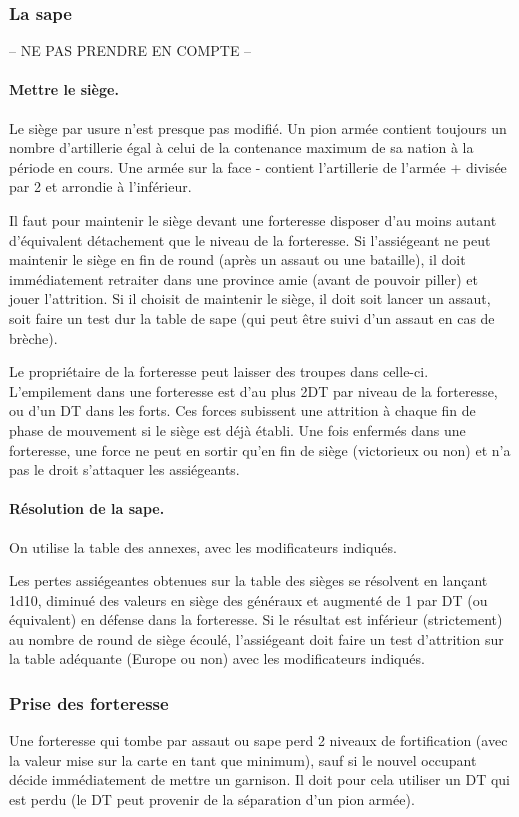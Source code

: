 \subsubsection{La sape}
-- NE PAS PRENDRE EN COMPTE --

\paragraph{Mettre le siège.}
Le siège par usure n'est presque pas modifié. Un pion armée  contient toujours
un nombre d'artillerie égal à celui de la contenance maximum de sa nation à la période en cours.
Une armée sur la face - contient l'artillerie de l'armée + divisée par 2 et arrondie
à l'inférieur.

Il faut pour maintenir le siège devant une forteresse disposer d'au moins autant
d'équivalent détachement que le niveau de la forteresse.
Si l'assiégeant ne peut maintenir le siège en fin de round (après un assaut ou une
bataille), il doit immédiatement retraiter dans une province amie (avant de pouvoir
piller) et jouer l'attrition.
Si il choisit de maintenir le siège, il doit soit lancer un assaut, soit faire
un test dur la table de sape (qui peut être suivi d'un assaut en cas de brèche).

Le propriétaire de la forteresse peut laisser des troupes dans celle-ci.
L'empilement dans une forteresse est d'au plus 2DT par niveau de la
forteresse, ou d'un DT dans les forts. Ces forces subissent une attrition
à chaque fin de phase de mouvement si le siège est déjà
établi. Une fois enfermés dans une forteresse, une force ne peut
en sortir qu'en fin de siège (victorieux ou non) et n'a pas le
droit s'attaquer les assiégeants.

\paragraph{Résolution de la sape.} On utilise la table des annexes,
avec les modificateurs indiqués.

Les pertes assiégeantes obtenues sur la table des sièges se résolvent
en lançant 1d10, diminué des valeurs en siège des généraux
et augmenté de 1 par DT (ou équivalent) en défense dans la forteresse.
Si le résultat est inférieur (strictement) au nombre de round
de siège écoulé, l'assiégeant doit faire un test d'attrition sur la table
adéquante (Europe ou non) avec les modificateurs indiqués.

\subsubsection{Prise des forteresse}
Une forteresse qui tombe par assaut ou sape perd 2 niveaux de
fortification (avec la valeur mise sur la carte en tant que minimum),
sauf si le nouvel occupant décide immédiatement de mettre un
garnison. Il doit pour cela utiliser un DT qui est perdu (le DT peut
provenir de la séparation d'un pion armée).


